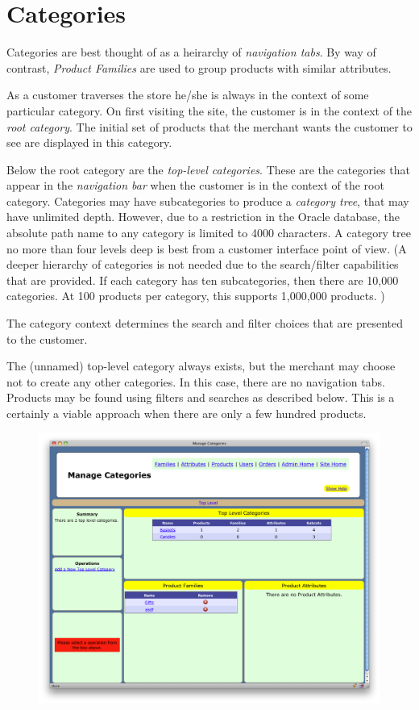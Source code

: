 \documentclass[letterpaper, 12pt]{article}
\begin{document}
\section{Categories}
Categories are best thought of as a heirarchy of {\em navigation tabs}.   By way of contrast, {\em Product Families} are used to group products with similar attributes.
\par
As a customer traverses the store he/she is always in the context of some particular category.  On first visiting the site, the customer is in the context of the {\em root category}.   The initial set of products that the merchant wants the customer to see are displayed in this category.
\par
Below the root category are the {\em top-level categories}.  These are the categories that appear in the {\em navigation bar} when the customer is in the context of the root category.  Categories may have subcategories to produce a {\em category tree}, that may have unlimited depth.  However, due to a restriction in the Oracle database, the  absolute path name to any category is limited to 4000 characters.   A category tree no more than four levels deep is best from a customer interface point of view.  (A  deeper hierarchy of categories is not needed due to the search/filter capabilities that are provided.  If each category has ten subcategories, then there are 10,000 categories.  At 100 products per category, this supports 1,000,000 products. )
\par
The category context determines the search and filter choices that are presented to the customer.
\par
The (unnamed) top-level category always exists, but the merchant may choose not to create any other categories.  In this case, there are no navigation tabs.  Products may be found using filters and searches as described below.  This is a certainly a viable approach when there are only a few hundred products.
\begin{figure}
\includegraphics[scale=0.4]{categories-show}
\end{figure}
\end{document}
